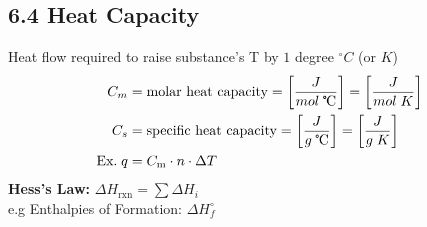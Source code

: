 \subsection{6.4 Heat Capacity}
    Heat flow required to raise substance's T by $1$ degree $^\circ C$ (or $K$)
    \begin{align*}
        C_m & = \text{molar heat capacity} = \left[\frac{J}{mol \; \tccentigrade}\right] = \left[\frac{J}{mol \; K}\right]\\
        C_s & = \text{specific heat capacity} = \left[\frac{J}{g \; \tccentigrade}\right] = \left[\frac{J}{g \; K}\right]\\
        \text{Ex.} \; q & = C_\text{m} \cdot n \cdot \Delta T
    \end{align*}
    \textbf{Hess's Law:} $\Delta H_\text{rxn} = \sum \Delta H_i$\\
    e.g Enthalpies of Formation: $\Delta H^\circ_f$